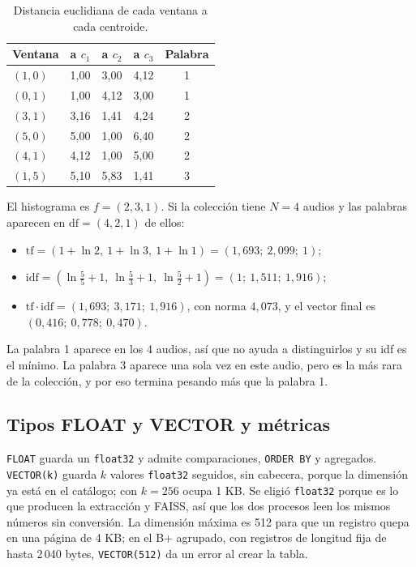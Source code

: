 \documentclass[11pt,a4paper]{article}
\begin{document}
\begin{table}[H]
\centering
\small
\begin{tabular}{lrrrc}
\toprule
Ventana & a $c_1$ & a $c_2$ & a $c_3$ & Palabra \\
\midrule
$(1, 0)$ & 1,00 & 3,00 & 4,12 & 1 \\
$(0, 1)$ & 1,00 & 4,12 & 3,00 & 1 \\
$(3, 1)$ & 3,16 & 1,41 & 4,24 & 2 \\
$(5, 0)$ & 5,00 & 1,00 & 6,40 & 2 \\
$(4, 1)$ & 4,12 & 1,00 & 5,00 & 2 \\
$(1, 5)$ & 5,10 & 5,83 & 1,41 & 3 \\
\bottomrule
\end{tabular}
\caption{Distancia euclidiana de cada ventana a cada centroide.}
\end{table}

El histograma es $f = (2, 3, 1)$. Si la colección tiene $N = 4$ audios y las palabras aparecen en $\mathrm{df} = (4, 2, 1)$ de ellos:
\begin{itemize}
  \item $\mathrm{tf} = (1 + \ln 2,\ 1 + \ln 3,\ 1 + \ln 1) = (1{,}693;\ 2{,}099;\ 1)$;
  \item $\mathrm{idf} = (\ln\frac{5}{5} + 1,\ \ln\frac{5}{3} + 1,\ \ln\frac{5}{2} + 1) = (1;\ 1{,}511;\ 1{,}916)$;
  \item $\mathrm{tf} \cdot \mathrm{idf} = (1{,}693;\ 3{,}171;\ 1{,}916)$, con norma $4{,}073$, y el vector final es $(0{,}416;\ 0{,}778;\ 0{,}470)$.
\end{itemize}

La palabra 1 aparece en los 4 audios, así que no ayuda a distinguirlos y su idf es el mínimo. La palabra 3 aparece una sola vez en este audio, pero es la más rara de la colección, y por eso termina pesando más que la palabra 1.

\subsection{Tipos FLOAT y VECTOR y métricas}

\texttt{FLOAT} guarda un \texttt{float32} y admite comparaciones, \texttt{ORDER BY} y agregados. \texttt{VECTOR(k)} guarda $k$ valores \texttt{float32} seguidos, sin cabecera, porque la dimensión ya está en el catálogo; con $k = 256$ ocupa 1 KB. Se eligió \texttt{float32} porque es lo que producen la extracción y FAISS, así que los dos procesos leen los mismos números sin conversión. La dimensión máxima es 512 para que un registro quepa en una página de 4 KB; en el B+ agrupado, con registros de longitud fija de hasta 2\,040 bytes, \texttt{VECTOR(512)} da un error al crear la tabla.
\end{document}

